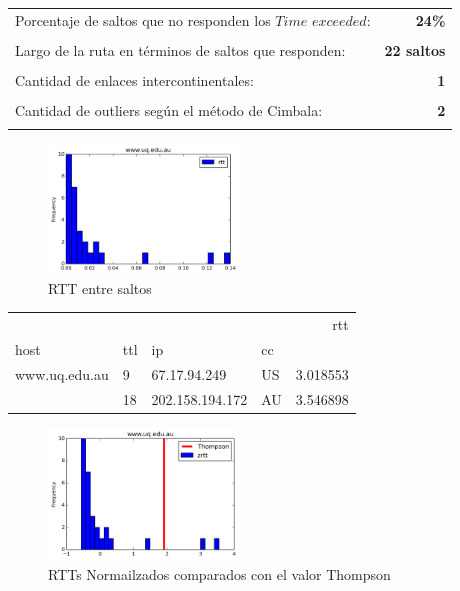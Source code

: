 \begin{center}
\begin{tabular}{p{6.5cm}r}
Porcentaje de saltos que no responden los $Time$ $exceeded$: & \textbf{24\%} \\ \\ 
Largo de la ruta en términos de saltos que responden: &\textbf{22 saltos} \\ \\
Cantidad de enlaces intercontinentales: & \textbf{1} \\ \\
Cantidad de outliers según el método de Cimbala: & \textbf{2} \\ \\
\end{tabular}
\end{center}

\begin{figure}[H]
  \centering
    \includegraphics[width=0.45\textwidth]{histogramas_rtt/www-uq-edu-au.png}
  \caption{RTT entre saltos}
  \label{entropia-s}
\end{figure}

\begin{center}
\begin{tabular}{llllr}
\toprule
              &    &                &    &       rtt \\
host & ttl & ip & cc &           \\
\midrule
www.uq.edu.au & 9  & 67.17.94.249 & US &  3.018553 \\
              & 18 & 202.158.194.172 & AU &  3.546898 \\
\bottomrule
\end{tabular}

\end{center}

\begin{figure}[H]
  \centering
    \includegraphics[width=0.45\textwidth]{histogramas_thompson/www-uq-edu-au.png}
  \caption{RTTs Normailzados comparados con el valor Thompson}
  \label{entropia-s}
\end{figure}

